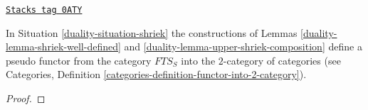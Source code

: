 \begin{lemma}
\label{duality-lemma-pseudo-functor}
\href{https://stacks.math.columbia.edu/tag/0ATY}{\texttt{Stacks tag 0ATY}}

In Situation \ref{duality-situation-shriek} the constructions of
Lemmas \ref{duality-lemma-shriek-well-defined} and \ref{duality-lemma-upper-shriek-composition}
define a pseudo functor from the category $\textit{FTS}_S$
into the $2$-category of categories (see Categories, Definition
\ref{categories-definition-functor-into-2-category}).
\end{lemma}

\begin{proof}


\end{proof}
